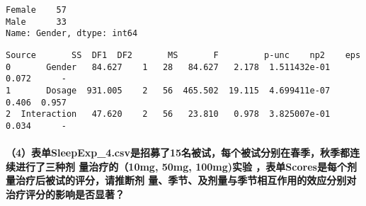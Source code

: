 \documentclass[11pt]{article}
\makeatletter
\newcommand{\boxspacing}{\kern\kvtcb@left@rule\kern\kvtcb@boxsep}
\newcommand{\prompt}[4]{
        \ttfamily\llap{{\color{#2}[#3]:\hspace{3pt}#4}}\vspace{-\baselineskip}
    }
\makeatother
\begin{document}
            \begin{tcolorbox}[breakable, size=fbox, boxrule=.5pt, pad at break*=1mm, opacityfill=0]
\prompt{Out}{outcolor}{11}{\boxspacing}
\begin{Verbatim}[commandchars=\\\{\}]
Female    57
Male      33
Name: Gender, dtype: int64
\end{Verbatim}
\end{tcolorbox}
        
            \begin{tcolorbox}[breakable, size=fbox, boxrule=.5pt, pad at break*=1mm, opacityfill=0]
\prompt{Out}{outcolor}{11}{\boxspacing}
\begin{Verbatim}[commandchars=\\\{\}]
        Source       SS  DF1  DF2       MS       F         p-unc    np2    eps
0       Gender   84.627    1   28   84.627   2.178  1.511432e-01  0.072      -
1       Dosage  931.005    2   56  465.502  19.115  4.699411e-07  0.406  0.957
2  Interaction   47.620    2   56   23.810   0.978  3.825007e-01  0.034      -
\end{Verbatim}
\end{tcolorbox}
        
    \hypertarget{ux8868ux5355sleepexp_4.csvux662fux62dbux52dfux4e8615ux540dux88abux8bd5ux6bcfux4e2aux88abux8bd5ux5206ux522bux5728ux6625ux5b63ux79cbux5b63ux90fdux8fdeux7eedux8fdbux884cux4e86ux4e09ux79cdux5242ux91cfux6cbbux7597ux768410mg-50mg-100mgux5b9eux9a8c-ux8868ux5355scoresux662fux6bcfux4e2aux5242ux91cfux6cbbux7597ux540eux88abux8bd5ux7684ux8bc4ux5206ux8bf7ux63a8ux65adux5242ux91cfux5b63ux8282ux53caux5242ux91cfux4e0eux5b63ux8282ux76f8ux4e92ux4f5cux7528ux7684ux6548ux5e94ux5206ux522bux5bf9ux6cbbux7597ux8bc4ux5206ux7684ux5f71ux54cdux662fux5426ux663eux8457}{%
\paragraph{（4）表单SleepExp\_4.csv是招募了15名被试，每个被试分别在春季，秋季都连续进行了三种剂
量治疗的（10mg,
50mg, 100mg)实验
，表单Scores是每个剂量治疗后被试的评分，请推断剂
量、季节、及剂量与季节相互作用的效应分别对治疗评分的影响是否显著？}\label{ux8868ux5355sleepexp_4.csvux662fux62dbux52dfux4e8615ux540dux88abux8bd5ux6bcfux4e2aux88abux8bd5ux5206ux522bux5728ux6625ux5b63ux79cbux5b63ux90fdux8fdeux7eedux8fdbux884cux4e86ux4e09ux79cdux5242ux91cfux6cbbux7597ux768410mg-50mg-100mgux5b9eux9a8c-ux8868ux5355scoresux662fux6bcfux4e2aux5242ux91cfux6cbbux7597ux540eux88abux8bd5ux7684ux8bc4ux5206ux8bf7ux63a8ux65adux5242ux91cfux5b63ux8282ux53caux5242ux91cfux4e0eux5b63ux8282ux76f8ux4e92ux4f5cux7528ux7684ux6548ux5e94ux5206ux522bux5bf9ux6cbbux7597ux8bc4ux5206ux7684ux5f71ux54cdux662fux5426ux663eux8457}}
\end{document}
